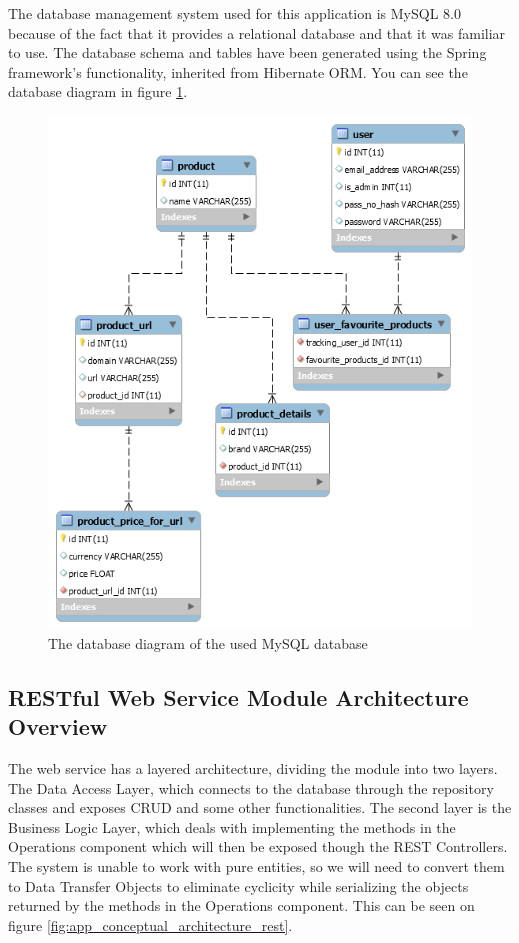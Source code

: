 \documentclass[12pt,a4paper,twoside]{report}
\begin{document}
The database management system used for this application is MySQL 8.0 because of the fact that it provides a relational database and that it was familiar to use. The database schema and tables have been generated using the Spring framework's functionality, inherited from Hibernate ORM. You can see the database diagram in figure \ref{fig:database_diagram}.

\begin{figure}[ht]
  \centering
  \includegraphics[width=0.65\linewidth]{img/database_diagram.png}
  \caption[]{The database diagram of the used MySQL database}
  \label{fig:database_diagram}
\end{figure}


\subsection{RESTful Web Service Module Architecture Overview}

The web service has a layered architecture, dividing the module into two layers. The Data Access Layer, which connects to the database through the repository classes and exposes CRUD and some other functionalities. The second layer is the Business Logic Layer, which deals with implementing the methods in the Operations component which will then be exposed though the REST Controllers. The system is unable to work with pure entities, so we will need to convert them to Data Transfer Objects to eliminate cyclicity while serializing the objects returned by the methods in the Operations component. This can be seen on figure \ref{fig:app_conceptual_architecture_rest}.
\end{document}
